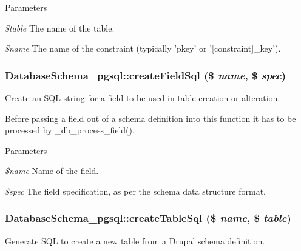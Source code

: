 \begin{DoxyParams}{Parameters}
\item[{\em \$table}]The name of the table. \item[{\em \$name}]The name of the constraint (typically 'pkey' or '\mbox{[}constraint\mbox{]}\_\-key'). \end{DoxyParams}
\hypertarget{classDatabaseSchema__pgsql_a77e847ece697a97079c2ecf0fb7eda47}{
\subsubsection[{createFieldSql}]{\setlength{\rightskip}{0pt plus 5cm}DatabaseSchema\_\-pgsql::createFieldSql (\$ {\em name}, \/  \$ {\em spec})}}
\label{classDatabaseSchema__pgsql_a77e847ece697a97079c2ecf0fb7eda47}
Create an SQL string for a field to be used in table creation or alteration.

Before passing a field out of a schema definition into this function it has to be processed by \_\-db\_\-process\_\-field().


\begin{DoxyParams}{Parameters}
\item[{\em \$name}]Name of the field. \item[{\em \$spec}]The field specification, as per the schema data structure format. \end{DoxyParams}
\hypertarget{classDatabaseSchema__pgsql_a71a8f78d8cabb3ad4a1db0e9f058e740}{
\subsubsection[{createTableSql}]{\setlength{\rightskip}{0pt plus 5cm}DatabaseSchema\_\-pgsql::createTableSql (\$ {\em name}, \/  \$ {\em table})}}
\label{classDatabaseSchema__pgsql_a71a8f78d8cabb3ad4a1db0e9f058e740}
Generate SQL to create a new table from a Drupal schema definition.


